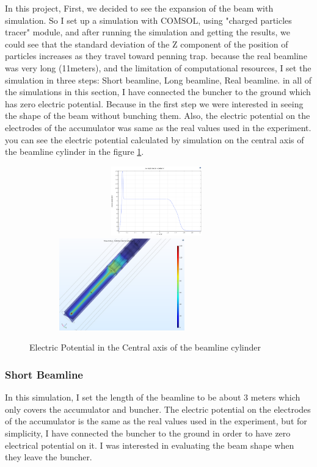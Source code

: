 \documentclass[12pt,a4paper]{article}
\begin{document}
In this project, First, we decided to see the expansion of the beam with simulation. So I set up a simulation with COMSOL, using "charged particles tracer" module, and after running the simulation and getting the results, we could see that the standard deviation of the Z component of the position of particles increases as they travel toward penning trap. because the real beamline was very long (11meters), and the limitation of computational resources, I set the simulation in three steps: Short beamline, Long beamline, Real beamline. in all of the simulations in this section, I have connected the buncher to the ground which has zero electric potential. Because in the first step we were interested in seeing the shape of the beam without bunching them. Also, the electric potential on the electrodes of the accumulator was same as the real values used in the experiment. you can see the electric potential calculated by simulation on the central axis of the beamline cylinder in the figure \ref{potential}.

\begin{figure}[h]

\centering
\includegraphics[width=110mm, height=30mm]{potential}
\includegraphics[width=80mm, height=40mm]{potential-3D}
\caption{Electric Potential in the Central axis of the beamline cylinder}
\label{potential}
\end{figure}

\subsubsection{Short Beamline}
In this simulation, I set the length of the beamline to be about 3 meters which only covers the accumulator and buncher. The electric potential on the electrodes of the accumulator is the same as the real values used in the experiment, but for simplicity, I have connected the buncher to the ground in order to have zero electrical potential on it. I was interested in evaluating the beam shape when they leave the buncher.
\end{document}
